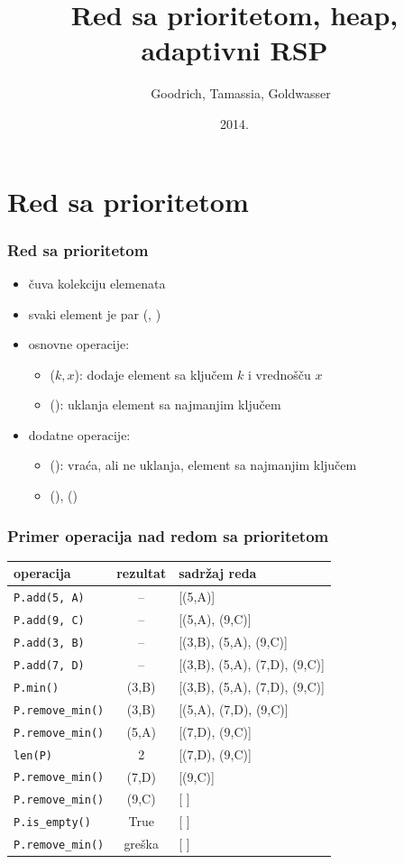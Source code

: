 \documentclass[compress]{beamer}
\title{Red sa prioritetom, heap, adaptivni RSP}
\author{\textcopyright \ \ Goodrich, Tamassia, Goldwasser}
\institute{Katedra za informatiku, Fakultet tehničkih nauka, Univerzitet u
Novom Sadu}
\date{2014.}
\begin{document}
\frame{\titlepage}

\section[Red sa prioritetom]{Red sa prioritetom}
\begin{frame}[fragile]
  \frametitle{Red sa prioritetom}
  \begin{itemize}
    \item {} čuva kolekciju elemenata 
    \item svaki element je par (, )
    \item osnovne operacije:
    \begin{itemize}
      \item {}($k, x$): dodaje element sa ključem $k$ i vrednošču $x$
      \item {}(): uklanja element sa najmanjim ključem 
    \end{itemize}
    \item dodatne operacije:
    \begin{itemize}
      \item {}(): vraća, ali ne uklanja, element sa najmanjim ključem
      \item {}(), () 
    \end{itemize}
  \end{itemize}
\end{frame}

\begin{frame}[fragile,shrink=10]
  \frametitle{Primer operacija nad redom sa prioritetom}
\begin{center}
\begin{tabular}{lcl}
\textbf{operacija} & \textbf{rezultat} & \textbf{sadržaj reda} \\
\hline \hline
\texttt{P.add(5, A)} & -- & [(5,A)] \\ 
\texttt{P.add(9, C)} & -- & [(5,A), (9,C)] \\ 
\texttt{P.add(3, B)} & -- & [(3,B), (5,A), (9,C)] \\ 
\texttt{P.add(7, D)} & -- & [(3,B), (5,A), (7,D), (9,C)] \\ 
\texttt{P.min()} & (3,B) & [(3,B), (5,A), (7,D), (9,C)] \\ 
\texttt{P.remove\_min()} & (3,B) & [(5,A), (7,D), (9,C)] \\ 
\texttt{P.remove\_min()} & (5,A) & [(7,D), (9,C)] \\ 
\texttt{len(P)} & 2 & [(7,D), (9,C)] \\
\texttt{P.remove\_min()} & (7,D) & [(9,C)] \\ 
\texttt{P.remove\_min()} & (9,C) & [ ] \\ 
\texttt{P.is\_empty()} & True & [ ] \\ 
\texttt{P.remove\_min()} & greška & [ ]
\end{tabular}
\end{center}
\end{frame}
\end{document}
